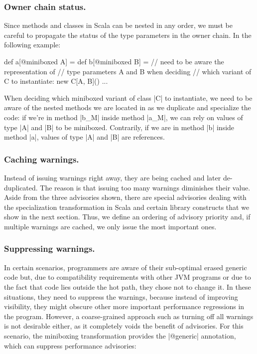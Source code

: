 \vspace{-0.5em}

\subsubsection{Owner chain status.} Since methods and classes in Scala can be nested in any order, we must be careful to propagate the status of the type parameters in the owner chain. In the following example:

\begin{lstlisting-nobreak}
 def a[@miniboxed A] = {
   def b[@miniboxed B] = {
     // need to be aware the representation of
     // type parameters A and B when deciding
     // which variant of C to instantiate:
     new C[A, B]()
   }
   ...
 }
\end{lstlisting-nobreak}

When deciding which miniboxed variant of class |C| to instantiate, we need to be aware of the nested methods we are located in as we duplicate and specialize the code: if we're in method |b_M| inside method |a_M|, we can rely on values of type |A| and |B| to be miniboxed. Contrarily, if we are in method |b| inside method |a|, values of type |A| and |B| are references.

\vspace{-0.5em}

\subsubsection{Caching warnings.} Instead of issuing warnings right away, they are being cached and later de-duplicated. The reason is that issuing too many warnings diminishes their value. Aside from the three advisories shown, there are special advisories dealing with the specialization transformation in Scala and certain library constructs that we show in the next section. Thus, we define an ordering of advisory priority and, if multiple warnings are cached, we only issue the most important ones.

\subsubsection{Suppressing warnings.} In certain scenarios, programmers are aware of their sub-optimal erased generic code but, due to compatibility requirements with other JVM programs or due to the fact that code lies outside the hot path, they chose not to change it. In these situations, they need to suppress the warnings, because instead of improving visibility, they might obscure other more important performance regressions in the program. However, a coarse-grained approach such as turning off all warnings is not desirable either, as it completely voids the benefit of advisories. For this scenario, the miniboxing transformation provides the |@generic| annotation, which can suppress performance advisories:

